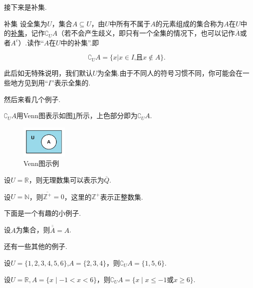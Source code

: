 \documentclass[lang=cn,math=cm,chinesefont=nofont,11pt,scheme=chinese,twocol]{elegantbook}
\begin{document}
  接下来是补集.
\begin{definition}{补集}
  设全集为$U$，集合$A\subseteq U$，由$U$中所有不属于$A$的元素组成的集合称为$A$在$U$中的\underline{补集}，记作${\complement}_{U}A$（若不会产生歧义，即只有一个全集的情况下，也可以记作$\overline{A}$或者$A^c$）.读作“$A$在$U$中的补集”.即

  $${\complement}_{U}A=\{x|x\in I\text{,且}x\notin A\}.$$
\end{definition}
\begin{remark}
  此后如无特殊说明，我们默认$U$为全集.由于不同人的符号习惯不同，你可能会在一些地方见到用“$I$”表示全集的.
\end{remark}
  然后来看几个例子.
\begin{example}
  $\complement_{U}A$用Venn图表示如图\ref{img:Venn3}所示，上色部分即为$\complement_{U}A$.
\end{example}
\begin{figure}[h]
  \centering
  \includegraphics[width=0.2\textwidth]{image/Venn3.png}
  \caption{Venn图示例}
  \label{img:Venn3}
\end{figure}

\begin{example}
  设$U=\mathbb{R}$，则无理数集可以表示为$\overline{Q}$.
\end{example}

\begin{example}
  设$U=\mathbb{N}$，则$\overline{\mathbb{Z}^+}={0}$，这里的$\mathbb{Z}^+$表示正整数集.
\end{example}

下面是一个有趣的小例子.

\begin{example}
  设$A$为集合，则$\overline{\overline{A}}=A$.
\end{example}

还有一些其他的例子.

\begin{example}
  设$U=\{1,2,3,4,5,6\}$,$A=\{2,3,4\}$，则$\complement_{U}A=\{1,5,6\}.$
\end{example}

\begin{example}
  设$U=\mathbb{R},A=\{x\mid -1<x<6\}$，则$\complement_{U}A=\{x\mid x\leq -1\text{或}x\geq 6\}.$
\end{example}
\end{document}
